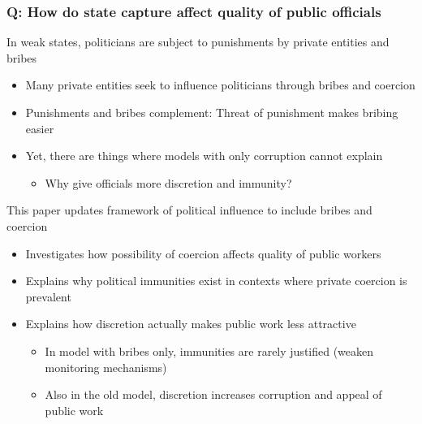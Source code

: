 \documentclass[aspectratio=169]{beamer}
\begin{document}
\begin{frame}
\frametitle{Q: How do state capture affect quality of public officials} 
In weak states, politicians are subject to punishments by private entities and bribes
\begin{itemize}\setlength\itemsep{3pt}
  \item Many private entities seek to influence politicians through bribes and coercion
\item Punishments and bribes complement: Threat of punishment makes bribing easier
\item Yet, there are things where models with only corruption cannot explain
\begin{itemize}
\item Why give officials more discretion and immunity?
\end{itemize}
\end{itemize}\medskip
This paper updates framework of political influence to include bribes and coercion
\begin{itemize}\setlength\itemsep{3pt}
\item Investigates how possibility of coercion affects quality of public workers 
\item Explains why political immunities exist in contexts where private coercion is prevalent
\item Explains how discretion actually makes public work less attractive
\begin{itemize}\setlength\itemsep{3pt}
\item In model with bribes only, immunities are rarely justified (weaken monitoring mechanisms)
\item Also in the old model, discretion increases corruption and appeal of public work
\end{itemize}
\end{itemize}
\end{frame}
\end{document}
